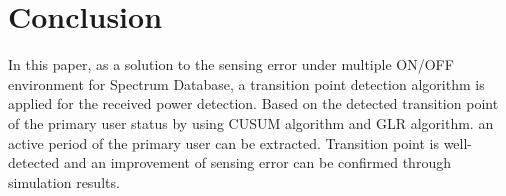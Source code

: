 \chapter[Conclusion]{Conclusion}
\label{chapter:Conclusion}

In this paper, as a solution to the sensing error under multiple ON/OFF environment for Spectrum Database, a transition point detection algorithm is applied for the received power detection. Based on the detected transition point of the primary user status by using CUSUM algorithm and GLR algorithm. an active period of the primary user can be extracted. Transition point is well-detected and an improvement of sensing error can be confirmed through simulation results.

